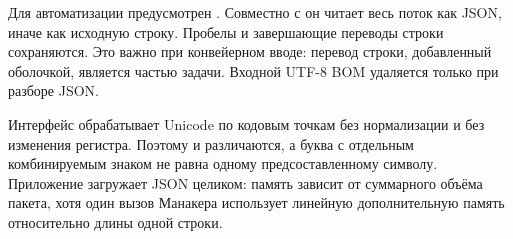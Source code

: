 Для автоматизации предусмотрен . Совместно с  он читает весь поток как JSON, иначе как исходную строку. Пробелы и завершающие переводы строки сохраняются. Это важно при конвейерном вводе: перевод строки, добавленный оболочкой, является частью задачи. Входной UTF-8 BOM удаляется только при разборе JSON.

Интерфейс обрабатывает Unicode по кодовым точкам без нормализации и без изменения регистра. Поэтому  и  различаются, а буква с отдельным комбинируемым знаком не равна одному предсоставленному символу. Приложение загружает JSON целиком: память зависит от суммарного объёма пакета, хотя один вызов Манакера использует линейную дополнительную память относительно длины одной строки.
